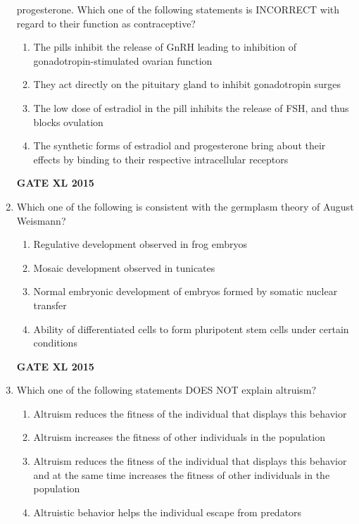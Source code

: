 \documentclass[journal,12pt,onecolumn]{IEEEtran}
\begin{document}
\begin{enumerate}
progesterone. Which one of the following statements is INCORRECT with regard to their function as contraceptive?
    \begin{enumerate}
            \item  The pills inhibit the release of GnRH leading to inhibition of gonadotropin-stimulated ovarian function
	    \item  They act directly on the pituitary gland to inhibit gonadotropin surges
	    \item The low dose of estradiol in the pill inhibits the release of FSH, and thus blocks ovulation
            \item The synthetic forms of estradiol and progesterone bring about their effects by binding to their respective intracellular receptors
    \end{enumerate}
\begin{flushright}\textbf{GATE XL 2015}\end{flushright}
\item Which one of the following is consistent with the germplasm theory of August Weismann?
    \begin{enumerate}
            \item Regulative development observed in frog embryos
	    \item Mosaic development observed in tunicates
	    \item Normal embryonic development of embryos formed by somatic nuclear transfer
            \item Ability of differentiated cells to form pluripotent stem cells under certain conditions
    \end{enumerate}
\begin{flushright}\textbf{GATE XL 2015}\end{flushright}
\item Which one of the following statements DOES NOT explain altruism?
    \begin{enumerate}
            \item Altruism reduces the fitness of the individual that displays this behavior
	    \item Altruism increases the fitness of other individuals in the population
	    \item Altruism reduces the fitness of the individual that displays this behavior and at the same time
increases the fitness of other individuals in the population
            \item  Altruistic behavior helps the individual escape from predators

\end{enumerate}
\end{enumerate}
\end{document}
